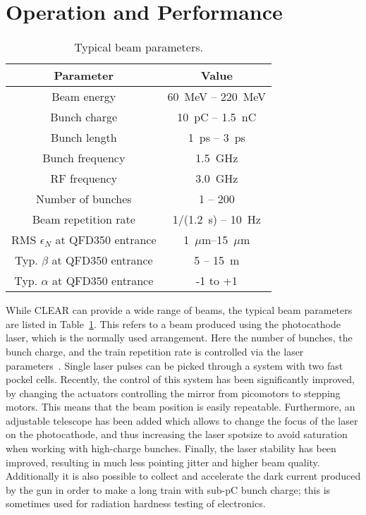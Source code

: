 \documentclass[a4paper,
               keeplastbox,   %
               ]{jacow}
\begin{document}
\section{Operation and Performance}

\begin{table}[t]
  \centering
  \caption{Typical beam parameters.}
  \label{tab:beamparameters}
  \begin{tabular}{c c}
    \toprule
    \textbf{Parameter} & \textbf{Value} \\
    \midrule
    Beam energy       &  60~MeV -- 220~MeV\\
    Bunch charge      &  10~pC  -- 1.5~nC \\
    Bunch length      &   1~ps  -- 3~ps \\
    Bunch frequency   &   1.5~GHz \\
    RF frequency      &   3.0~GHz \\
    Number of bunches &   1 -- 200 \\
    Beam repetition rate   & 1/(1.2~s) -- 10~Hz \\
    RMS $\epsilon_N$ at QFD350 entrance & 1~$\mu$m--15~$\mu$m\\
    Typ. $\beta$ at QFD350 entrance & 5 -- 15~m \\
    Typ. $\alpha$ at QFD350 entrance & -1 to +1 \\
    \bottomrule
  \end{tabular}
\end{table}

While CLEAR can provide a wide range of beams, the typical beam parameters are listed in Table~\ref{tab:beamparameters}.
This refers to a beam produced using the photocathode laser, which is the normally used arrangement.
Here the number of bunches, the bunch charge, and the train repetition rate is controlled via the laser parameters~\cite{LucaGun,BrossardGun}.
Single laser pulses can be picked through a system with two fast pockel cells.
Recently, the control of this system has been significantly improved, by changing the actuators controlling the mirror from picomotors to stepping motors.
This means that the beam position is easily repeatable.
Furthermore, an adjustable telescope has been added which allows to change the focus of the laser on the photocathode, and thus increasing the laser spotsize to avoid saturation when working with high-charge bunches.
Finally, the laser stability has been improved, resulting in much less pointing jitter and higher beam quality.
Additionally it is also possible to collect and accelerate the dark current produced by the gun in order to make a long train with sub-pC bunch charge; this is sometimes used for radiation hardness testing of electronics.
\end{document}
